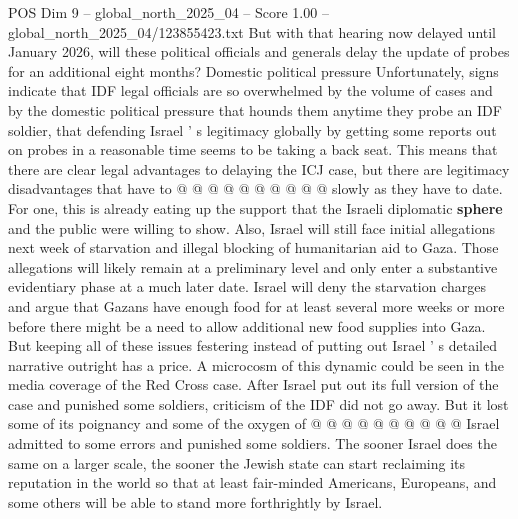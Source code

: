 \begin{textsample}{POS Dim 9 – global\_north\_2025\_04 – Score 1.00 – global\_north\_2025\_04/123855423.txt}
But with that hearing now delayed until January 2026, will these political officials and generals delay the update of probes for an additional eight months?
Domestic political pressure Unfortunately, signs indicate that IDF legal officials are so overwhelmed by the volume of cases and by the domestic political pressure that hounds them anytime they probe an IDF soldier, that defending Israel ' s legitimacy globally by getting some reports out on probes in a reasonable time seems to be taking a back seat.
This means that there are clear legal advantages to delaying the ICJ case, but there are legitimacy disadvantages that have to @ @ @ @ @ @ @ @ @ @ slowly as they have to date.
For one, this is already eating up the support that the Israeli diplomatic \textbf{sphere} and the public were willing to show.
Also, Israel will still face initial allegations next week of starvation and illegal blocking of humanitarian aid to Gaza.
Those allegations will likely remain at a preliminary level and only enter a substantive evidentiary phase at a much later date.
Israel will deny the starvation charges and argue that Gazans have enough food for at least several more weeks or more before there might be a need to allow additional new food supplies into Gaza.
But keeping all of these issues festering instead of putting out Israel ' s detailed narrative outright has a price.
A microcosm of this dynamic could be seen in the media coverage of the Red Cross case.
After Israel put out its full version of the case and punished some soldiers, criticism of the IDF did not go away.
But it lost some of its poignancy and some of the oxygen of @ @ @ @ @ @ @ @ @ @ Israel admitted to some errors and punished some soldiers.
The sooner Israel does the same on a larger scale, the sooner the Jewish state can start reclaiming its reputation in the world so that at least fair-minded Americans, Europeans, and some others will be able to stand more forthrightly by Israel.

\end{textsample}
